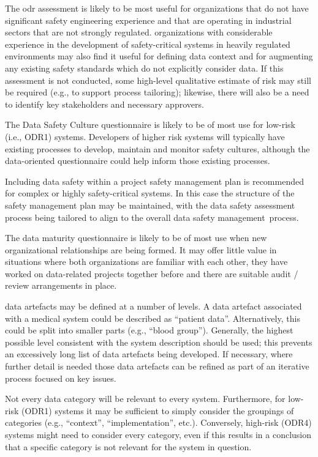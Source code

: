 The \gls{odr} assessment is likely to be most useful for organizations that do not have significant safety engineering experience and that are operating in industrial sectors that are not strongly regulated.
organizations with considerable experience in the development of safety-critical systems in heavily regulated environments
may also find it useful for defining data context and for augmenting any existing safety standards which do not explicitly consider data.
If this assessment is not conducted, some high-level qualitative estimate of risk may still be required (e.g., to support process \gls{tailoring}); likewise, there will also be a need to identify key \glspl{stakeholder} and necessary approvers.

The Data Safety Culture questionnaire is likely to be of most use for low-risk (i.e., ODR1) systems. Developers of higher risk systems will typically have existing processes to develop, maintain and monitor safety cultures, although the data-oriented questionnaire could help inform those existing processes.

Including data safety within a project safety management plan is recommended for complex or highly safety-critical systems. In this case the structure of the safety management plan may be maintained, with the \gls{data safety assessment} process being tailored to align to the overall \cbstart data safety management\cbend\ process.

The data maturity questionnaire is likely to be of most use when new organizational relationships are being formed. It may offer little value in situations where both organizations are familiar with each other, they have worked on data-related projects together before and there are suitable audit / review arrangements in place.

\Glspl{data artefact} may be defined at a number of levels. A \gls{data artefact} associated with a medical system could be described as ``patient data''. Alternatively, this could be split into smaller parts (e.g., ``blood group''). Generally, the highest possible level consistent with the system description should be used; this prevents an excessively long list of \glspl{data artefact} being developed. If necessary, where further detail is needed those \glspl{data artefact} can be refined as part of an iterative process focused on key issues.

Not every data category will be relevant to every system. Furthermore, for low-risk (ODR1) systems it may be sufficient to simply consider the groupings of categories (e.g., ``context'', ``implementation'', etc.). Conversely, high-risk (ODR4) systems might need to consider every category, even if this results in a conclusion that a specific category is not relevant for the system in question.

